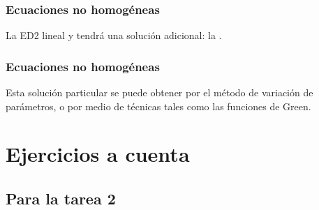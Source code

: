 \documentclass[12pt]{beamer}
\begin{document}
\begin{frame}
\frametitle{Ecuaciones no homogéneas}
La ED2 lineal y  tendrá una solución adicional: \pause la .
\end{frame}
\begin{frame}
\frametitle{Ecuaciones no homogéneas}
Esta solución particular se puede obtener por el método de variación de parámetros, o por medio de técnicas tales como las funciones de Green.
\end{frame}

\section{Ejercicios a cuenta}
\subsection{Para la tarea 2}
\end{document}
